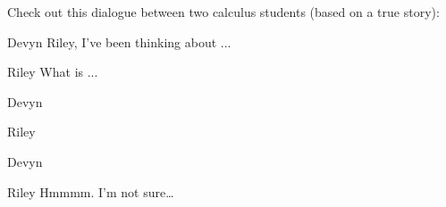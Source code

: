 \documentclass{ximera}
\title[Break-Ground:]{ }
\begin{document}
\begin{abstract}
\end{abstract}
\maketitle

Check out this dialogue between two calculus students (based on a true
story):

\begin{dialogue}
\item[Devyn] Riley, I've been thinking about ...
\item[Riley] What is ...
\item[Devyn] 
\item[Riley] 
\item[Devyn] 
\item[Riley] Hmmmm. I'm not sure\dots
\end{dialogue}





\end{document}
